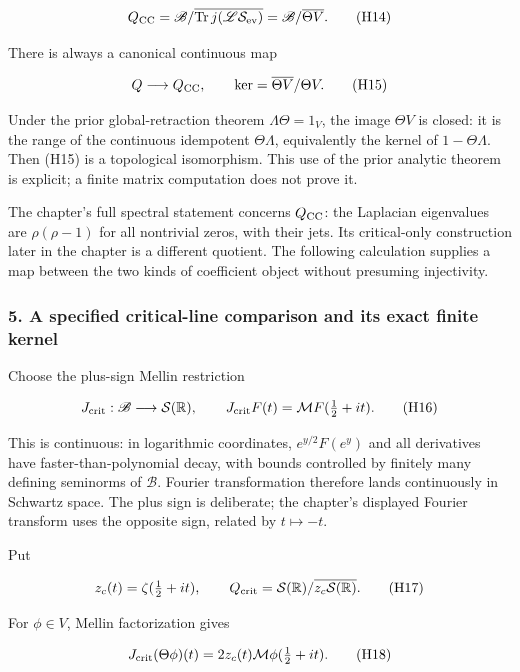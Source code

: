 \[
Q_{\rm CC}=\mathscr B/\overline{\operatorname{Tr}j(\mathscr L\mathcal S_{\rm ev})}
=\mathscr B/\overline{\Theta V}.
\tag{H14}
\]

There is always a canonical continuous map

\[
Q\longrightarrow Q_{\rm CC},\qquad
\ker=\overline{\Theta V}/\Theta V.
\tag{H15}
\]

Under the prior global-retraction theorem \(\Lambda\Theta=1_V\), the image \(\Theta V\) is closed: it is the range of the continuous idempotent \(\Theta\Lambda\), equivalently the kernel of \(1-\Theta\Lambda\). Then (H15) is a topological isomorphism. This use of the prior analytic theorem is explicit; a finite matrix computation does not prove it.

The chapter's full spectral statement concerns \(Q_{\rm CC}\): the Laplacian eigenvalues are \(\rho(\rho-1)\) for all nontrivial zeros, with their jets. Its critical-only construction later in the chapter is a different quotient. The following calculation supplies a map between the two kinds of coefficient object without presuming injectivity.

\subsubsection{5. A specified critical-line comparison and its exact finite kernel}\label{endpoint-cc_hochschild--a-specified-critical-line-comparison-and-its-exact-finite-kernel}

Choose the plus-sign Mellin restriction

\[
J_{\rm crit}:\mathscr B\longrightarrow\mathcal S(\mathbb R),\qquad
J_{\rm crit}F(t)=\mathcal MF(\tfrac12+it).
\tag{H16}
\]

This is continuous: in logarithmic coordinates, \(e^{y/2}F(e^y)\) and all derivatives have faster-than-polynomial decay, with bounds controlled by finitely many defining seminorms of \(\mathscr B\). Fourier transformation therefore lands continuously in Schwartz space. The plus sign is deliberate; the chapter's displayed Fourier transform uses the opposite sign, related by \(t\mapsto-t\).

Put

\[
z_c(t)=\zeta(\tfrac12+it),\qquad
Q_{\rm crit}=\mathcal S(\mathbb R)/\overline{z_c\mathcal S(\mathbb R)}.
\tag{H17}
\]

For \(\phi\in V\), Mellin factorization gives

\[
J_{\rm crit}(\Theta\phi)(t)=2z_c(t)\mathcal M\phi(\tfrac12+it).
\tag{H18}
\]

